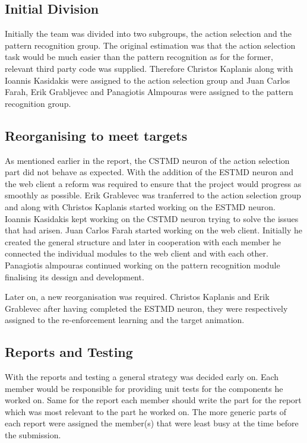 \documentclass[a4paper,11pt]{article}
\begin{document}
\subsection{Initial Division}
Initially the team was divided into two subgroups, the action selection and the pattern recognition group. The original estimation was that the action selection task would be much easier than the pattern recognition as for the former, relevant third party code was supplied. Therefore Christos Kaplanis along with Ioannis Kasidakis were assigned to the action selection group and Juan Carlos Farah, Erik Grabljevec and Panagiotis Almpouras were assigned to the pattern recognition group.

\subsection{Reorganising to meet targets}
As mentioned earlier in the report, the CSTMD neuron of the action selection part did not behave as expected. With the addition of the ESTMD neuron and the web client a reform was required to ensure that the project would progress as smoothly as possible. Erik Grablevec was tranferred to the action selection group and along with Christos Kaplanis started working on the ESTMD neuron. Ioannis Kasidakis kept working on the CSTMD neuron trying to solve the issues that had arisen. Juan Carlos Farah started working on the web client. Initially he created the general structure and later in cooperation with each member he connected the individual modules to the web client and with each other. Panagiotis almpouras continued working on the pattern recognition module finalising its dessign and development.\par

Later on, a new reorganisation was required. Christos Kaplanis  and Erik Grablevec after having completed the ESTMD neuron, they were respectively assigned to the re-enforcement learning and the target animation.

\subsection{Reports and Testing}
With the reports and testing a general strategy was decided early on. Each member would be responsible for providing unit tests for the components he worked on. Same for the report each member should write the part for the report which was most relevant to the part he worked on. The more generic parts of each report were assigned the member(s) that were least busy at the time before the submission.
\end{document}
